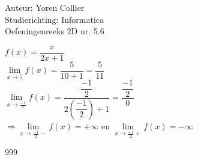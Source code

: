 \documentclass[a4paper]{article}
\newcommand{\adR}{\Rightarrow} %
\newcommand{\Lh}{\left(} %
\newcommand{\Rh}{\right)}
\newcommand{\pnR}{\rightarrow} %
\newcommand{\limiet}{\lim\limits_}
\begin{document}
\noindent \large Auteur: Yoren Collier \\
\noindent \large Studierichting: Informatica\\
\noindent \large Oefeningenreeks 2D nr. 5.6\\

\medskip

\normalsize

$f(x) = \dfrac{x}{2x+1}$\\

$\limiet{x \pnR 5} f(x) = \dfrac{5}{10+1} = \dfrac{5}{11}$\\

$\limiet{x \pnR \tfrac{-1}{2}} f(x) = \dfrac{\dfrac{-1}{2}}{2\Lh \dfrac{-1}{2} \Rh + 1} = \dfrac{\dfrac{-1}{2}}{0}$\\

$\adR \limiet{x \pnR \tfrac{-1}{2}-} f(x) = +\infty \text{  en } \limiet{x \pnR \tfrac{-1}{2}+} f(x) = -\infty$

\begin{thebibliography}{999}
\end{thebibliography}
\end{document}
